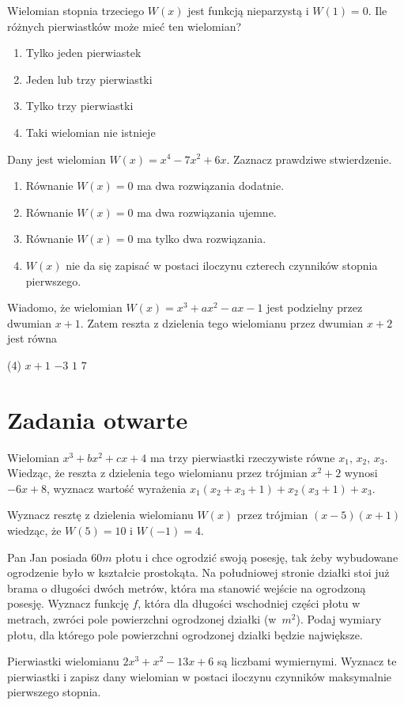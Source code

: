 \zadanie Wielomian stopnia trzeciego $W(x)$ jest funkcją nieparzystą i $W(1) = 0$. Ile różnych pierwiastków może mieć ten wielomian?
\begin{enumerate}[label=\alph*)]
	\item Tylko jeden pierwiastek
	\item Jeden lub trzy pierwiastki
	\item Tylko trzy pierwiastki %
	\item Taki wielomian nie istnieje
\end{enumerate}

\zadanie Dany jest wielomian $W(x) = x^4 - 7x^2 + 6x$. Zaznacz prawdziwe stwierdzenie.
\begin{enumerate}[label=\alph*)]
	\item Równanie $W(x) = 0$ ma dwa rozwiązania dodatnie. %
	\item Równanie $W(x) = 0$ ma dwa rozwiązania ujemne.
	\item Równanie $W(x) = 0$ ma tylko dwa rozwiązania.
	\item $W(x)$ nie da się zapisać w postaci iloczynu czterech czynników stopnia pierwszego.
\end{enumerate}

\zadanie Wiadomo, że wielomian $W(x) = x^3 + ax^2 - ax - 1$ jest podzielny przez dwumian $x + 1$. Zatem reszta z dzielenia tego wielomianu przez dwumian $x + 2$ jest równa
\begin{tasks}(4)
	\task $x + 1$
	\task $-3$ %
	\task $1$
	\task $7$
\end{tasks}

\section{Zadania otwarte}

\zadanie Wielomian $x^3 + bx^2 + cx + 4$ ma trzy pierwiastki rzeczywiste równe $x_1,\, x_2,\, x_3$. Wiedząc, że reszta z dzielenia tego wielomianu przez trójmian $x^2 + 2$ wynosi $-6x + 8$, wyznacz wartość wyrażenia $x_1(x_2 + x_3 + 1) + x_2(x_3 + 1) + x_3$. %

\zadanie Wyznacz resztę z dzielenia wielomianu $W(x)$ przez trójmian $(x - 5)(x + 1)$ wiedząc, że $W(5) = 10$ i $W(-1) = 4$. %

\zadanie Pan Jan posiada $60m$ płotu i chce ogrodzić swoją posesję, tak żeby wybudowane ogrodzenie było w kształcie prostokąta. Na południowej stronie działki stoi już brama o długości dwóch metrów, która ma stanowić wejście na ogrodzoną posesję. Wyznacz funkcję $f$, która dla długości wschodniej części płotu w metrach, zwróci pole powierzchni ogrodzonej działki (w~$m^2$). Podaj wymiary płotu, dla którego pole powierzchni ogrodzonej działki będzie największe. %

\zadanie Pierwiastki wielomianu $2x^3 + x^2 - 13x + 6$ są liczbami wymiernymi. Wyznacz te pierwiastki i zapisz dany wielomian w postaci iloczynu czynników maksymalnie pierwszego stopnia. %